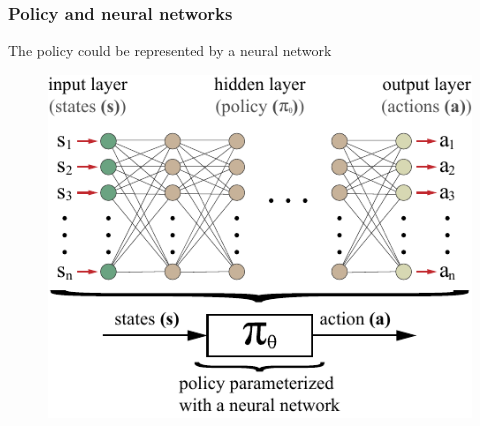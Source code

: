 \begin{frame}
	\frametitle{Policy and neural networks}
	
	The policy could be represented by a neural network

	\begin{figure}
		\centering
		\includegraphics{policy_cnn.pdf}
	\end{figure}

\end{frame}

